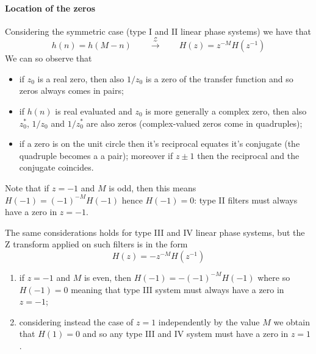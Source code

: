 		\paragraph{Location of the zeros} Considering the symmetric case (type I and II linear phase systems) we have that
		\[ h(n) = h(M-n) \qquad \xrightarrow{\mathcal Z} \qquad H(z) = z^{-M} H(z^{-1}) \]
		We can so observe that
		\begin{itemize}
			\item if $z_0$ is a real zero, then also $1/z_0$ is a zero of the transfer function and so zeros always comes in pairs;
			\item if $h(n)$ is real evaluated and $z_0$ is more generally a complex zero, then also $z_0^*$, $1/z_0$ and $1/z_0^*$ are also zeros (complex-valued zeros come in quadruples);
			\item if a zero is on the unit circle then it's reciprocal equates it's conjugate (the quadruple becomes a a pair); moreover if $z\pm 1$ then the reciprocal and the conjugate coincides.
		\end{itemize}
		Note that if $z=-1$ and $M$ is odd, then this means $H(-1) = (-1)^{-M}H(-1)$ hence $H(-1)=0$: type II filters must always have a zero in $z=-1$.
		
		The same considerations holds for type III and IV linear phase systems, but the Z transform applied on such filters is in the form
		\[ H(z) = - z^{-M} H(z^{-1}) \]
		\begin{enumerate}
			\item if $z=-1$ and $M$ is even, then $H(-1) = -(-1)^{-M} H(-1)$ where so $H(-1) = 0$ meaning that type III system must always have a zero in $z=-1$;
			\item considering instead the case of $z=1$ independently by the value $M$ we obtain that $H(1) = 0$ and so any type III and IV system must have a zero in $z=1$.
		\end{enumerate}
	
